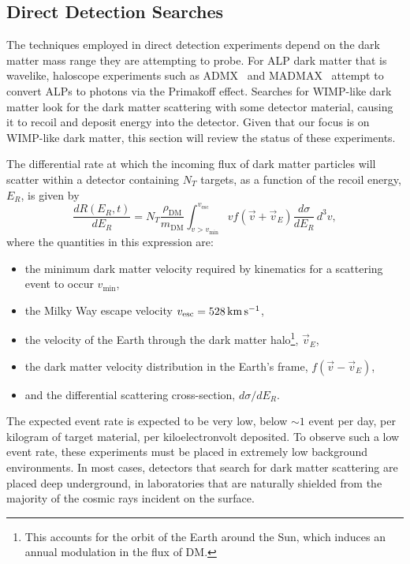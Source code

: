 \subsection{Direct Detection Searches}
\label{ch1:subsec:DDsearches}
The techniques employed in direct detection experiments depend on the dark matter mass range they are attempting to probe.
For ALP dark matter that is wavelike, haloscope experiments 
such as ADMX~\cite{ADMX:2009iij_SQUIDbasedmicrowavecavity} and MADMAX~\cite{MADMAX:2019pub_mar_Newexperimentalapproach} 
attempt to convert ALPs to photons via the Primakoff effect. 
Searches for WIMP-like dark matter look for the dark matter scattering with some detector
material, causing it to recoil and deposit energy into the detector. Given that our focus is on WIMP-like dark matter, 
this section will review the status of these experiments.

The differential rate at which the incoming flux of dark matter particles will scatter within a detector containing $N_T$ targets, as a function of the recoil energy, $E_R$, is given by
\begin{equation}
    \frac{d R(E_R, t)}{dE_R} = N_T \frac{\rho_\mathrm{DM}}{m_\mathrm{DM}}\int_{v>v_\mathrm{min}}^{v_\mathrm{esc}}v f(\vec{v} + \vec{v}_E)\frac{d\sigma}{dE_R}\,d^3v,
    \label{ch1:eq:DD_rate}
\end{equation}
 where the quantities in this expression are:
\begin{itemize}
    \item the minimum dark matter velocity required by kinematics for a scattering event to occur $v_\mathrm{min}$,
    \item the Milky Way escape velocity $v_\mathrm{esc} = 528{\rm \,km}{\rm \,s}^{-1}$,
    \item the velocity of the Earth through the dark matter halo\footnote{This accounts for the orbit of the Earth around the Sun, which induces an annual modulation in the flux of DM.}, $\vec{v}_E$,
    \item the dark matter velocity distribution in the Earth's frame, $f(\vec{v} - \vec{v}_E)$, 
    \item and the differential scattering cross-section, $d\sigma/dE_R$.
\end{itemize}
The expected event rate is expected to be very low, below $\sim 1$ event per day, per kilogram of target material, per kiloelectronvolt deposited. To observe such a low event rate, these experiments must be placed in extremely low background environments. In most cases, detectors that search for dark matter scattering are placed deep underground, in laboratories that are naturally shielded from the majority of the cosmic rays incident on the surface. 

